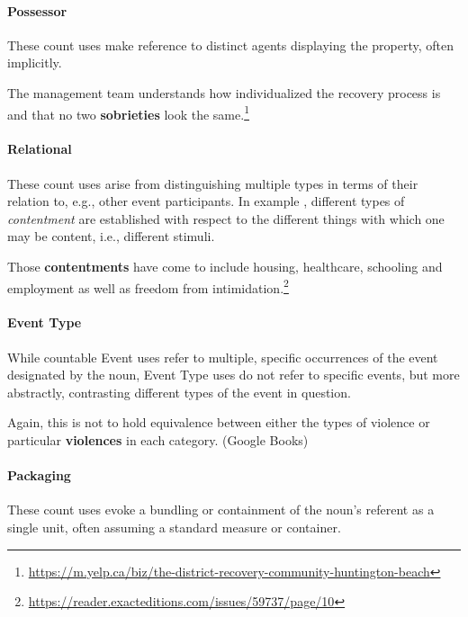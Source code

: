 \documentclass[output=paper]{langscibook}
\begin{document}
\paragraph*{Possessor} These count uses make reference to distinct agents displaying the property, often implicitly.

\eanoraggedright \label{gri-ric:ex:sobrieties} The management team understands how individualized the recovery process is and that no two \textbf{sobrieties} look the same.\footnote{\url{https://m.yelp.ca/biz/the-district-recovery-community-huntington-beach}} \z


\paragraph*{Relational} These count uses  arise from distinguishing multiple types in terms of their relation to, e.g., other event participants.  In example , different types of \textit{contentment} are established with respect to the different things with which one may be content, i.e., different stimuli.


\eanoraggedright \label{gri-ric:ex:contentments} Those \textbf{contentments} have come to include housing, healthcare, schooling and employment as well as freedom from intimidation.\footnote{\url{https://reader.exacteditions.com/issues/59737/page/10}} \z

\paragraph*{Event Type} While countable Event uses refer to multiple, specific occurrences of the event designated by the noun, Event Type uses do not refer to specific events, but more abstractly, contrasting different types of the event in question.


\eanoraggedright \label{gri-ric:ex:violences} Again, this is not to hold equivalence between either the types of violence or particular \textbf{violences} in each category. \hfill (Google Books)\z



\paragraph*{Packaging}  These count uses  evoke a bundling or containment of the noun's referent as a single unit, often assuming a standard measure or container. %
\end{document}
